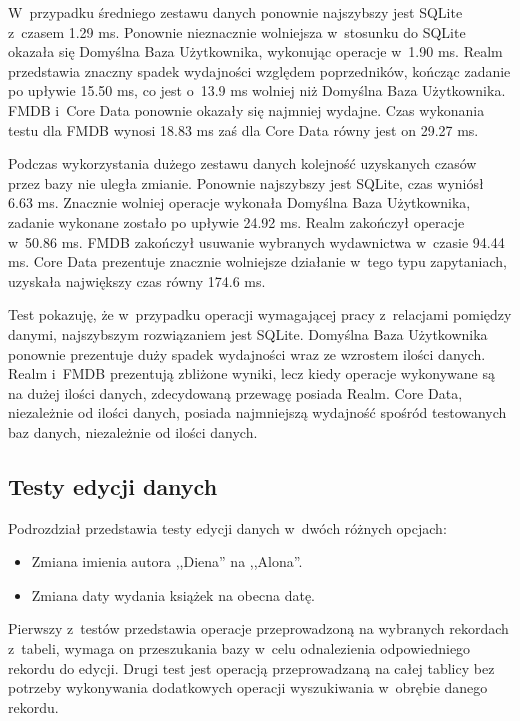  W~przypadku średniego zestawu danych ponownie najszybszy jest SQLite z~czasem 1.29 ms. Ponownie nieznacznie wolniejsza w~stosunku do SQLite okazała się Domyślna Baza Użytkownika, wykonując operacje w~1.90 ms. Realm przedstawia znaczny spadek wydajności względem poprzedników, kończąc zadanie po upływie 15.50 ms, co jest o~13.9 ms wolniej niż Domyślna Baza Użytkownika. FMDB i~Core Data ponownie okazały się najmniej wydajne. Czas wykonania testu dla FMDB wynosi 18.83 ms zaś dla Core Data równy jest on 29.27 ms.

Podczas wykorzystania dużego zestawu danych kolejność uzyskanych czasów przez bazy nie uległa zmianie. Ponownie najszybszy jest SQLite, czas wyniósł 6.63 ms. Znacznie wolniej operacje wykonała Domyślna Baza Użytkownika, zadanie wykonane zostało po upływie 24.92 ms. Realm zakończył operacje w~50.86 ms. FMDB zakończył usuwanie wybranych wydawnictwa w~czasie 94.44 ms. Core Data prezentuje znacznie wolniejsze działanie w~tego typu zapytaniach, uzyskała największy czas równy 174.6 ms. 

Test pokazuję, że w~przypadku operacji wymagającej pracy z~relacjami pomiędzy danymi, najszybszym rozwiązaniem jest SQLite. Domyślna Baza Użytkownika ponownie prezentuje duży spadek wydajności wraz ze wzrostem ilości danych. Realm i~FMDB prezentują zbliżone wyniki, lecz kiedy operacje wykonywane są na dużej ilości danych, zdecydowaną przewagę posiada Realm. Core Data, niezależnie od ilości danych, posiada najmniejszą wydajność spośród testowanych baz danych, niezależnie od ilości danych.

\subsection{Testy edycji danych}

Podrozdział przedstawia testy edycji danych w~dwóch różnych opcjach: 

\begin{itemize}
\item Zmiana imienia autora ,,Diena'' na ,,Alona''.
\item Zmiana daty wydania książek na obecna datę.
\end{itemize}

Pierwszy z~testów przedstawia operacje przeprowadzoną na wybranych rekordach z~tabeli, wymaga on przeszukania bazy w~celu odnalezienia odpowiedniego rekordu do edycji. Drugi test jest operacją przeprowadzaną na całej tablicy bez potrzeby wykonywania dodatkowych operacji wyszukiwania w~obrębie danego rekordu.

